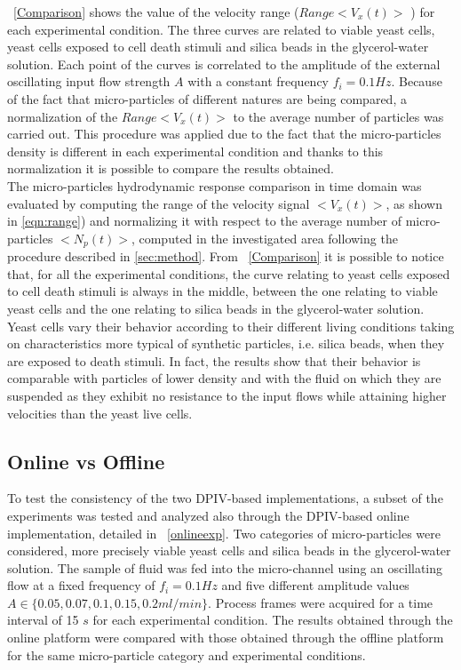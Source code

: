 \documentclass[journal]{IEEEtran}
\theoremstyle{definition}
\theoremstyle{remark}
\begin{document}
~\fig\ref{Comparison} shows the value of the velocity range ($Range<V_x(t)>$ ) for each experimental condition. The three curves are related to viable yeast cells, yeast cells exposed to cell death stimuli and silica beads in the glycerol-water solution. Each point of the curves is correlated to the amplitude of the external oscillating input flow strength $A$ with a constant frequency $f_i= 0.1 Hz$. 
Because of the fact that micro-particles of different natures are being compared, a normalization of the $Range<V_x(t)>$ to the average number of particles was carried out. This procedure was applied due to the fact that the micro-particles density is different in each experimental condition and thanks to this normalization it is possible to compare the results obtained. 
\\The micro-particles hydrodynamic response comparison in time domain was evaluated by computing the range of the velocity signal $<V_x(t)>$, as shown in \DS{\eqn(}\ref{eqn:range}) and normalizing it with respect to the average number of micro-particles $<N_p(t)>$, computed in the investigated area following the procedure described in \sect\ref{sec:method}.
From ~\fig\ref{Comparison} it is possible to notice that, for all the experimental conditions, the curve relating to yeast cells exposed to cell death stimuli is always in the middle, between the one relating to viable yeast cells and the one relating to silica beads in the glycerol-water solution.
Yeast cells vary their behavior according to their different living conditions taking on characteristics more typical of synthetic particles, i.e. silica beads, when they are exposed to death stimuli. In fact, the results show that their behavior is comparable with particles of lower density and with the fluid on which they are suspended as they exhibit no resistance to the input flows while attaining higher velocities than the yeast live cells.

\subsection{Online vs Offline}\label{sec:OnlineOffline}
To test the consistency of the two DPIV-based implementations, a subset of the experiments was tested and analyzed also through the DPIV-based online implementation, detailed in ~\tab\ref{onlineexp}. Two categories of micro-particles were considered, more precisely viable yeast cells and silica beads in the glycerol-water solution. The sample of fluid was fed into the micro-channel using an oscillating flow at a fixed frequency of $f_i= 0.1 Hz$ and five different amplitude values $A \in \{ 0.05, 0.07, 0.1, 0.15, 0.2 ml/min \}$. Process frames were acquired for a time interval of 15 $s$ for each experimental condition. 
The results obtained through the online platform were compared with those obtained through the offline platform for the same micro-particle category and experimental conditions. 
\end{document}
